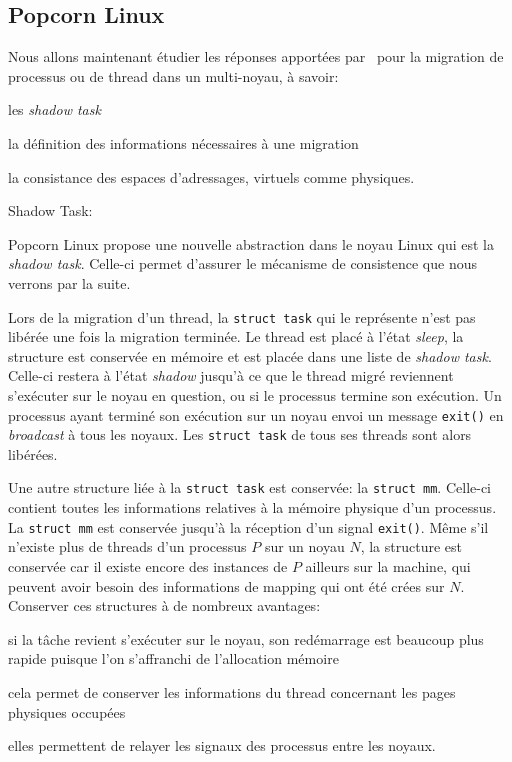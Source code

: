     \subsection{Popcorn Linux}

      Nous allons maintenant étudier les réponses apportées
      par~\citet{katz2013popcorn} pour la migration de processus ou de thread
      dans un multi-noyau, à savoir: \benumline \item les \textit{shadow
        task} \item la définition des informations nécessaires à une
      migration \item la consistance des espaces d'adressages, virtuels comme
      physiques\eenumline.

      \begin{paragraph}{Shadow Task:}

        Popcorn Linux propose une nouvelle abstraction dans le noyau Linux qui
        est la \textit{shadow task}. Celle-ci permet d'assurer le mécanisme de
        consistence que nous verrons par la suite.

        Lors de la migration d'un thread, la \texttt{struct task} qui le
        représente n'est pas libérée une fois la migration terminée. Le thread
        est placé à l'état \textit{sleep}, la structure est conservée en mémoire
        et est placée dans une liste de \textit{shadow task}. Celle-ci restera à
        l'état \textit{shadow} jusqu'à ce que le thread migré reviennent
        s'exécuter sur le noyau en question, ou si le processus termine son
        exécution. Un processus ayant terminé son exécution sur un noyau envoi
        un message \texttt{exit()} en \textit{broadcast} à tous les noyaux. Les
        \texttt{struct task} de tous ses threads sont alors libérées.

        Une autre structure liée à la \texttt{struct task} est conservée: la
        \texttt{struct mm}. Celle-ci contient toutes les informations relatives
        à la mémoire physique d'un processus. La \texttt{struct mm} est
        conservée jusqu'à la réception d'un signal \texttt{exit()}. Même s'il
        n'existe plus de threads d'un processus $P$ sur un noyau $N$, la
        structure est conservée car il existe encore des instances de $P$
        ailleurs sur la machine, qui peuvent avoir besoin des informations de
        mapping qui ont été crées sur $N$.\\

        Conserver ces structures à de nombreux avantages:\benumline \item
        si la tâche revient s'exécuter sur le noyau, son redémarrage est
        beaucoup plus rapide puisque l'on s'affranchi de l'allocation
        mémoire \item cela permet de conserver les informations du thread
        concernant les pages physiques occupées \item elles permettent de
        relayer les signaux des processus entre les noyaux\eenumline.

      \end{paragraph}

